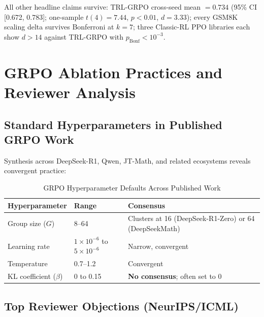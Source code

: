 \documentclass[12pt,a4paper]{report}
\theoremstyle{definition}
\begin{document}
All other headline claims survive: TRL-GRPO cross-seed mean $= 0.734$ (95\% CI [0.672, 0.783]; one-sample
$t(4) = 7.44$, $p < 0.01$, $d = 3.33$); every GSM8K scaling delta survives Bonferroni at $k = 7$; three
Classic-RL PPO libraries each show $d > 14$ against TRL-GRPO with $p_{\text{Bonf}} < 10^{-3}$.


\chapter{GRPO Ablation Practices and Reviewer Analysis}
\label{ch:ablation}

\section{Standard Hyperparameters in Published GRPO Work}
\label{sec:ablation-hparams}

Synthesis across DeepSeek-R1, Qwen, JT-Math, and related ecosystems reveals convergent practice:

\begin{table}[htbp]
\centering
\caption{GRPO Hyperparameter Defaults Across Published Work}
\label{tab:grpo-defaults}
\begin{tabular}{lll}
\toprule
\textbf{Hyperparameter} & \textbf{Range} & \textbf{Consensus} \\
\midrule
Group size ($G$) & 8--64 & Clusters at 16 (DeepSeek-R1-Zero) or 64 (DeepSeekMath) \\
Learning rate & $1 \times 10^{-6}$ to $5 \times 10^{-6}$ & Narrow, convergent \\
Temperature & 0.7--1.2 & Convergent \\
KL coefficient ($\beta$) & 0 to 0.15 & \textbf{No consensus}; often set to 0 \\
\bottomrule
\end{tabular}
\end{table}

\section{Top Reviewer Objections (NeurIPS/ICML)}
\label{sec:reviewer-objections}
\end{document}

